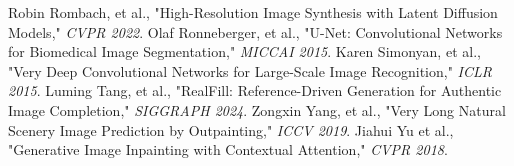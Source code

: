 \documentclass[sigconf]{acmart}
\begin{document}
\begin{thebibliography}{9}
     Robin Rombach, et al., "High-Resolution Image Synthesis with Latent Diffusion Models," \textit{CVPR 2022}.
     Olaf Ronneberger, et al., "U-Net: Convolutional Networks for Biomedical Image Segmentation," \textit{MICCAI 2015}.
     Karen Simonyan, et al., "Very Deep Convolutional Networks for Large-Scale Image Recognition," \textit{ICLR 2015}.
     Luming Tang, et al., "RealFill: Reference-Driven Generation for Authentic Image Completion," \textit{SIGGRAPH 2024}.
     Zongxin Yang, et al., "Very Long Natural Scenery Image Prediction by Outpainting," \textit{ICCV 2019}.
     Jiahui Yu et al., "Generative Image Inpainting with Contextual Attention," \textit{CVPR 2018}.
\end{thebibliography}
\end{document}
